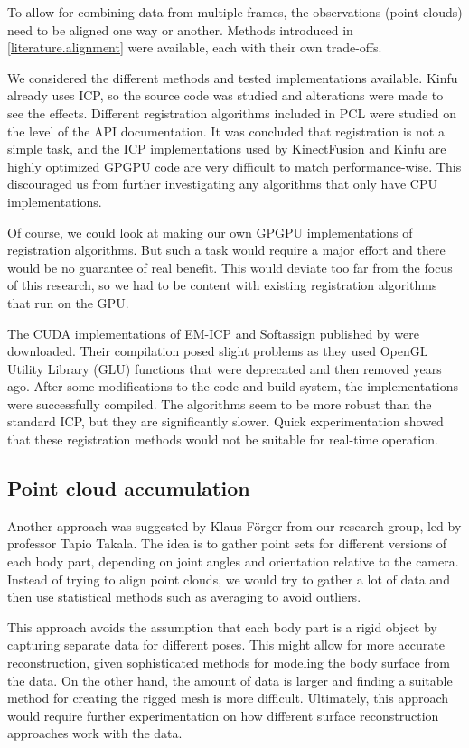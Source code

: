To allow for combining data from multiple frames, the observations (point clouds) need to be aligned one way or another. Methods introduced in \autoref{literature.alignment} were available, each with their own trade-offs.

We considered the different methods and tested implementations available. Kinfu already uses ICP, so the source code was studied and alterations were made to see the effects. Different registration algorithms included in PCL were studied on the level of the API documentation. It was concluded that registration is not a simple task, and the ICP implementations used by KinectFusion and Kinfu are highly optimized GPGPU code are very difficult to match performance-wise. This discouraged us from further investigating any algorithms that only have CPU implementations.

Of course, we could look at making our own GPGPU implementations of registration algorithms. But such a task would require a major effort and there would be no guarantee of real benefit. This would deviate too far from the focus of this research, so we had to be content with existing registration algorithms that run on the GPU.

The CUDA implementations of EM-ICP and Softassign published by \citet{tamaki2010softassign} were downloaded. Their compilation posed slight problems as they used OpenGL Utility Library (GLU) functions that were deprecated and then removed years ago. After some modifications to the code and build system, the implementations were successfully compiled. The algorithms seem to be more robust than the standard ICP, but they are significantly slower. Quick experimentation showed that these registration methods would not be suitable for real-time operation.

\subsection{Point cloud accumulation}


Another approach was suggested by Klaus Förger from our research group, led by professor Tapio Takala. The idea is to gather point sets for different versions of each body part, depending on joint angles and orientation relative to the camera. Instead of trying to align point clouds, we would try to gather a lot of data and then use statistical methods such as averaging to avoid outliers.

This approach avoids the assumption that each body part is a rigid object by capturing separate data for different poses. This might allow for more accurate reconstruction, given sophisticated methods for modeling the body surface from the data. On the other hand, the amount of data is larger and finding a suitable method for creating the rigged mesh is more difficult. Ultimately, this approach would require further experimentation on how different surface reconstruction approaches work with the data.

